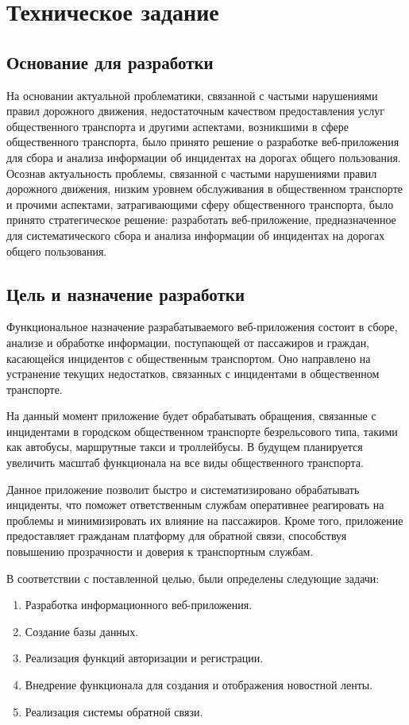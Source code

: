 \section{Техническое задание}
\subsection{Основание для разработки}

На основании актуальной проблематики, связанной с частыми нарушениями правил дорожного движения, недостаточным качеством предоставления услуг общественного транспорта и другими аспектами, возникшими в сфере общественного транспорта, было принято решение о разработке веб-приложения для сбора и анализа информации об инцидентах на дорогах общего пользования.
Осознав актуальность проблемы, связанной с частыми нарушениями правил дорожного движения, низким уровнем обслуживания в общественном транспорте и прочими аспектами, затрагивающими сферу общественного транспорта, было принято стратегическое решение: разработать веб-приложение, предназначенное для систематического сбора и анализа информации об инцидентах на дорогах общего пользования.

\subsection{Цель и назначение разработки}

Функциональное назначение разрабатываемого веб-приложения состоит в сборе, анализе и обработке информации, поступающей от пассажиров и граждан, касающейся инцидентов с общественным транспортом.
Оно направлено на устранение текущих недостатков, связанных с инцидентами в общественном транспорте.
 
 На данный момент приложение будет обрабатывать обращения, связанные с инцидентами в городском общественном транспорте безрельсового типа, такими как автобусы, маршрутные такси и троллейбусы. В будущем планируется увеличить масштаб функционала на все виды общественного транспорта.
 
Данное приложение позволит быстро и систематизировано обрабатывать инциденты, что поможет ответственным службам оперативнее реагировать на проблемы и минимизировать их влияние на пассажиров. Кроме того, приложение предоставляет гражданам платформу для обратной связи, способствуя повышению прозрачности и доверия к транспортным службам.

В соответствии с поставленной целью, были определены следующие задачи:
\begin{enumerate}
\item Разработка информационного веб-приложения.
\item Создание базы данных.
\item Реализация функций авторизации и регистрации.
\item Внедрение функционала для создания и отображения новостной ленты.
\item Реализация системы обратной связи.
\end{enumerate}

